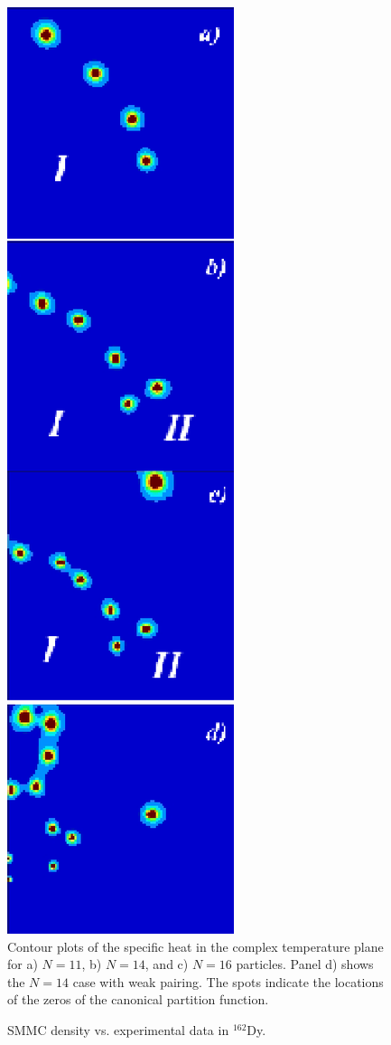 \documentclass[rmp,aps,floatfix]{revtex4}
\begin{document}
\begin{figure}
\includegraphics[scale=1.0,angle=0]{dean_hjorthjensen_fig32.ps}
\caption{Contour plots of the specific heat in the complex temperature plane
for a) $N=11$, b) $N=14$, and c) $N=16$ particles. Panel d) 
shows the $N=14$ case with weak pairing.  
The spots indicate the locations of the 
zeros of the canonical partition function.} 
\label{fig:contourplot}
\end{figure}


\begin{figure}
{\hskip 0.5in }
\caption{SMMC density vs. experimental
data in $^{162}$Dy.
\label{fig:dy162}}
\end{figure}
\end{document}
